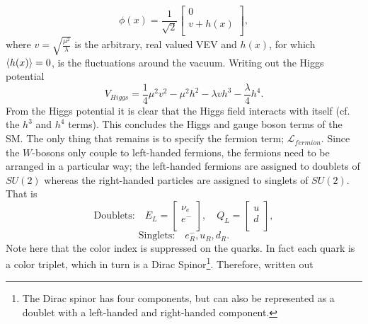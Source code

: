 \begin{equation}
	\phi(x)=\frac{1}{\sqrt{2}}\begin{bmatrix}
		0\\
		v+h(x)\\
	\end{bmatrix},
	\label{higgs}
\end{equation} 
where $v=\sqrt{\frac{\mu^2}{\lambda}}$ is the arbitrary, real valued VEV and $h(x)$, for which $\braket{h(x)}=0$, is the fluctuations around the vacuum. Writing out the Higgs potential
\begin{equation}
	V_{Higgs}=\frac{1}{4}\mu^2v^2-\mu^2h^2-\lambda v h^3-\frac{\lambda}{4}h^4.
\end{equation} 
From the Higgs potential it is clear that the Higgs field interacts with itself (cf. the $h^3$ and $h^4$ terms). This concludes the Higgs and gauge boson terms of the SM. The only thing that remains is to specify the fermion term; $\mathcal{L}_{fermion}$. Since the $W$-bosons only couple to left-handed fermions, the fermions need to be arranged in a particular way; the left-handed fermions are assigned to doublets of $SU(2)$ whereas the right-handed particles are assigned to singlets of $SU(2)$. That is
\begin{equation}
	\text{Doublets:}\quad E_L=\begin{bmatrix}
		\nu_e\\
		e^-\\
	\end{bmatrix}, \quad Q_L=\begin{bmatrix}
	u \\
	d \\
\end{bmatrix},
\end{equation} 
\begin{equation}
	\text{Singlets:}\quad e_R^-,u_R,d_R.
\end{equation} 
Note here that the color index is suppressed on the quarks. In fact each quark is a color triplet, which in turn is a Dirac Spinor\footnote{The Dirac spinor has four components, but can also be represented as a doublet with a left-handed and right-handed component.}. Therefore, written out
